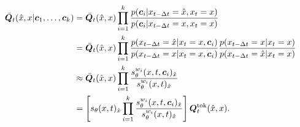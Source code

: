 \begin{equation}
\label{eq:PFG_bayes3}
\begin{aligned}
\bar{{\bm{Q}}}_t(\hat{x},x|\bm{c}_1,\ldots,\bm{c}_k) &= \bar{{\bm{Q}}}_t(\hat{x},x)\prod\limits_{i=1}^{k}\frac{p(\bm{c}_i | x_{t-\Delta t}=\hat{x}, x_{t}=x )}{p(\bm{c}_i | x_{t-\Delta t}={x}, x_{t}=x )} \\
&= \bar{{\bm{Q}}}_t(\hat{x},x) \prod\limits_{i=1}^{k} \frac{p(x_{t-\Delta t}=\hat{x}|x_{t}=x,\bm{c}_i)}{p(x_{t-\Delta t}=x|x_{t}=x,\bm{c}_i)}\frac{p(x_{t-\Delta t}=x|x_{t}=x)}{p(x_{t-\Delta t}=\hat{x}|x_{t}=x)}\\
&\approx \bar{{\bm{Q}}}_t(\hat{x},x) \prod\limits_{i=1}^{k}\frac{s^{w_i}_\theta(x,t,\bm{c}_i)_{\hat{x}}}{s^{w_i}_\theta(x,t)_{\hat{x}}}\\
&=\left[s_\theta(x,t)_{\hat{x}}\prod\limits_{i=1}^{k}\frac{s^{w_i}_\theta(x,t,\bm{c}_i)_{\hat{x}}}{s^{w_i}_\theta(x,t)_{\hat{x}}}\right]{\bm{Q}}^\text{tok}_t(\hat{x},x).
\end{aligned}
\end{equation}





